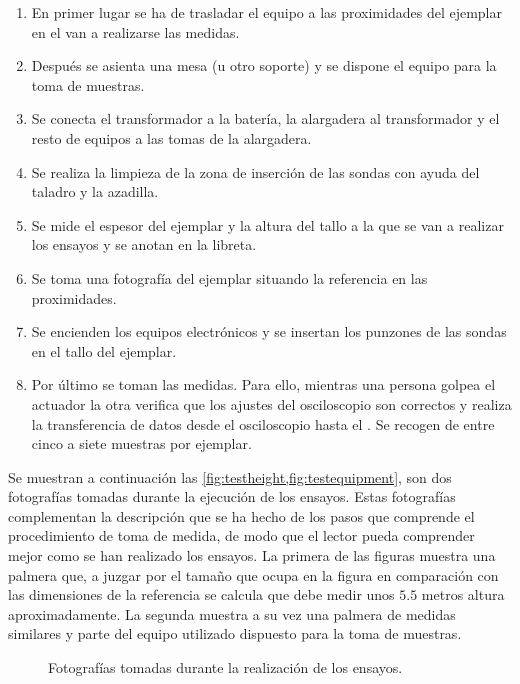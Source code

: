 \begin{enumerate}
    \item En primer lugar se ha de trasladar el equipo a las proximidades
	del ejemplar en el van a realizarse las medidas.
    \item Después se asienta una mesa (u otro soporte) y se dispone el
	equipo para la toma de muestras.
    \item Se conecta el transformador a la batería, la alargadera al
	transformador y el resto de equipos a las tomas de la alargadera.
    \item Se realiza la limpieza de la zona de inserción de las sondas con
	ayuda del taladro y la azadilla.
    \item Se mide el espesor del ejemplar y la altura del tallo a la que se
	van a realizar los ensayos y se anotan en la libreta.
    \item Se toma una fotografía del ejemplar situando la referencia en las
	proximidades.
    \item Se encienden los equipos electrónicos y se insertan los punzones
	de las sondas en el tallo del ejemplar.
    \item Por último se toman las medidas. Para ello, mientras una persona
	golpea el actuador la otra verifica que los ajustes del
	osciloscopio son correctos y realiza la transferencia de datos
	desde el osciloscopio hasta el . Se recogen de entre cinco
	a siete muestras por ejemplar.
\end{enumerate}

Se muestran a continuación las \cref{fig:testheight,fig:testequipment}, son
dos fotografías tomadas durante la ejecución de los ensayos. Estas
fotografías complementan la descripción que se ha hecho de los pasos que
comprende el procedimiento de toma de medida, de modo que el lector pueda
comprender mejor como se han realizado los ensayos. La primera de las
figuras muestra una palmera que, a juzgar por el tamaño que ocupa en la
figura en comparación con las dimensiones de la referencia se calcula que
debe medir unos $5.5$ metros altura aproximadamente. La segunda muestra a
su vez una palmera de medidas similares y parte del equipo utilizado
dispuesto para la toma de muestras.

\begin{figure}
    \begin{center}
		\end{center}
    \caption[Fotografías tomadas durante la realización de los
    ensayos]{Fotografías tomadas durante la realización de los ensayos.}
    \label{fig:tests}
\end{figure}


